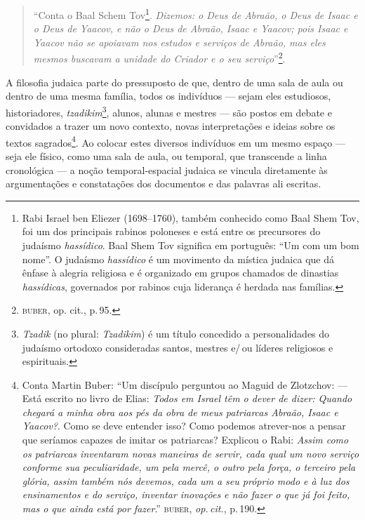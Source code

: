 \begin{center}\end{center}

\noindent{}\begin{quote}
``Conta o Baal Schem Tov\footnote{Rabi Israel ben Eliezer (1698--1760),
  também conhecido como Baal Shem Tov, foi um dos principais rabinos
  poloneses e está entre os precursores do judaísmo \emph{hassídico}.
  Baal Shem Tov significa em português: ``Um com um bom nome''. O judaísmo \emph{hassídico} é um movimento da mística judaica
  que dá ênfase à alegria religiosa e é organizado em grupos chamados de
  dinastias \emph{hassídicas}, governados por rabinos cuja liderança é
  herdada nas famílias.}. \emph{Dizemos: o Deus de Abraão, o Deus de Isaac e
o Deus de Yaacov, e não o Deus de Abraão, Isaac e Yaacov; pois Isaac e
Yaacov não se apoiavam nos estudos e serviços de Abraão, mas eles mesmos
buscavam a unidade do Criador e o seu serviço}''\footnote{\textsc{buber}, op.
  cit., p.\,95.}.
\end{quote}

A filosofia judaica parte do pressuposto de que, dentro de uma sala de
aula ou dentro de uma mesma família, todos os indivíduos --- sejam eles
estudiosos, historiadores, \emph{tzadikim}\footnote{\emph{Tzadik} (no
  plural: \emph{Tzadikim}) é um título concedido a personalidades do
  judaísmo ortodoxo consideradas santos, mestres e/\,ou líderes religiosos
  e espirituais.}, alunos, alunas e mestres --- são postos em debate e
convidados a trazer um novo contexto, novas interpretações e ideias
sobre os textos sagrados\footnote{Conta Martin Buber: ``Um
  discípulo perguntou ao Maguid de Zlotzchov: --- Está escrito no livro
  de Elias: \emph{Todos em Israel têm o dever de dizer: Quando chegará a
  minha obra aos pés da obra de meus patriarcas Abraão, Isaac e
  Yaacov?}. Como se deve entender isso? Como podemos atrever-nos a
  pensar que seríamos capazes de imitar os patriarcas? Explicou o Rabi:
  \emph{Assim como os patriarcas inventaram novas maneiras de servir, cada
  qual um novo serviço conforme sua peculiaridade, um pela mercê, o
  outro pela força, o terceiro pela glória, assim também nós devemos,
  cada um a seu próprio modo e à luz dos ensinamentos e do serviço,
  inventar inovações e não fazer o que já foi feito, mas o que ainda
  está por fazer}.'' \textsc{buber}, \emph{op.\,cit.}, p.\,190.}. Ao colocar estes diversos indivíduos
em um mesmo espaço --- seja ele físico, como uma sala de aula, ou
temporal, que transcende a linha cronológica --- a noção
temporal-espacial judaica se vincula diretamente às argumentações e
constatações dos documentos e das palavras ali escritas.

